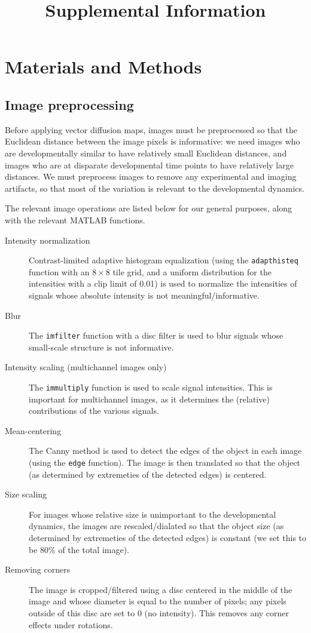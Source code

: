 \documentclass[10pt,twocolumn]{article}
\title{Supplemental Information}
\date{}
\begin{document}
\maketitle


\section*{Materials and Methods}

\subsection*{Image preprocessing}

Before applying vector diffusion maps, images must be preprocessed so that the Euclidean distance between the image pixels is informative: we need images who are developmentally similar to have relatively small Euclidean distances, and images who are at disparate developmental time points to have relatively large distances. 
%
We must preprocess images to remove any experimental and imaging artifacts, so that most of the variation is relevant to the developmental dynamics. 

The relevant image operations are listed below for our general purposes, along with the relevant MATLAB functions. 
\begin{description}

\item[Intensity normalization] Contrast-limited adaptive histogram equalization (using the \texttt{adapthisteq} function with an $8 \times 8$ tile grid, and a uniform distribution for the intensities with a clip limit of 0.01) is used to normalize the intensities of signals whose absolute intensity is not meaningful/informative.
%
\item[Blur] The \texttt{imfilter} function with a disc filter is used to blur signals whose small-scale structure is not informative. 
%
\item[Intensity scaling (multichannel images only)] The \texttt{immultiply} function is used to scale signal intensities. This is important for multichannel images, as it determines the (relative) contributions of the various signals.  
%
\item[Mean-centering]  The Canny method \citep{canny1986computational} is used to detect the edges of the object in each image (using the \texttt{edge} function). The image is then translated so that the object (as determined by extremeties of the detected edges) is centered.
%
\item[Size scaling] For images whose relative size is unimportant to the developmental dynamics, the images are rescaled/dialated so that the object size (as determined by extremeties of the detected edges) is constant (we set this to be 80\% of the total image).
%
\item[Removing corners] The image is cropped/filtered using a disc centered in the middle of the image and whose diameter is equal to the number of pixels; any pixels outside of this disc are set to 0 (no intensity). This removes any corner effects under rotations. 
\end{description}
\end{document}
